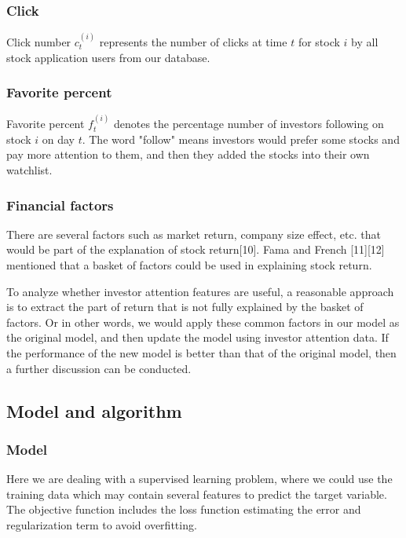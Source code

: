 \documentclass[letterpaper]{article}
\begin{document}
\subsubsection{Click}

Click number $c^{(i)}_{t}$ represents the number of clicks at time $t$ for stock $i$ by all stock application users from our database.

\subsubsection{Favorite percent}

Favorite percent $f^{(i)}_{t}$ denotes the percentage number of investors following on stock $i$ on day $t$. The word "follow" means investors would prefer some stocks and pay more attention to them, and then they added the stocks into their own watchlist. 


\subsubsection{Financial factors}

There are several factors such as market return, company size effect, etc. that would be part of the explanation of stock return[10]. Fama and French [11][12] mentioned that a basket of factors could be used in explaining stock return. 

To analyze whether investor attention features are useful, a reasonable approach is to extract the part of return that is not fully explained by the basket of factors. Or in other words, we would apply these common factors in our model as the original model, and then update the model using investor attention data. If the performance of the new model is better than that of the original model, then a further discussion can be conducted. 

\subsection{Model and algorithm}

\subsubsection{Model}

Here we are dealing with a supervised learning problem, where we could use the training data which may contain several features to predict the target variable. 
The objective function includes the loss function estimating the error and regularization term to avoid overfitting. 
\end{document}
